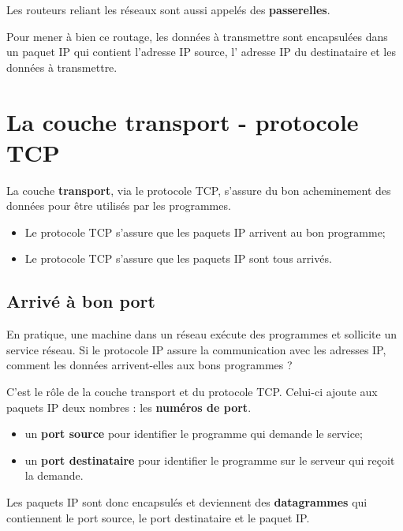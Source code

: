 \documentclass[11pt]{article}
\providecommand{\tightlist}{%
      \setlength{\itemsep}{0pt}\setlength{\parskip}{0pt}}
\begin{document}
    Les routeurs reliant les réseaux sont aussi appelés des
\textbf{passerelles}.

Pour mener à bien ce routage, les données à transmettre sont encapsulées
dans un paquet IP qui contient l'adresse IP source, l' adresse IP du
destinataire et les données à transmettre.

    \hypertarget{la-couche-transport---protocole-tcp}{%
\section{La couche transport - protocole
TCP}\label{la-couche-transport---protocole-tcp}}

La couche \textbf{transport}, via le protocole TCP, s'assure du bon
acheminement des données pour être utilisés par les programmes.

\begin{itemize}
\tightlist
\item
  Le protocole TCP s'assure que les paquets IP arrivent au bon
  programme;
\item
  Le protocole TCP s'assure que les paquets IP sont tous arrivés.
\end{itemize}

\hypertarget{arrivuxe9-uxe0-bon-port}{%
\subsection{Arrivé à bon port}\label{arrivuxe9-uxe0-bon-port}}

En pratique, une machine dans un réseau exécute des programmes et
sollicite un service réseau. Si le protocole IP assure la communication
avec les adresses IP, comment les données arrivent-elles aux bons
programmes ?

C'est le rôle de la couche transport et du protocole TCP. Celui-ci
ajoute aux paquets IP deux nombres : les \textbf{numéros de port}.

\begin{itemize}
\tightlist
\item
  un \textbf{port source} pour identifier le programme qui demande le
  service;
\item
  un \textbf{port destinataire} pour identifier le programme sur le
  serveur qui reçoit la demande.
\end{itemize}

Les paquets IP sont donc encapsulés et deviennent des
\textbf{datagrammes} qui contiennent le port source, le port
destinataire et le paquet IP.
\end{document}
